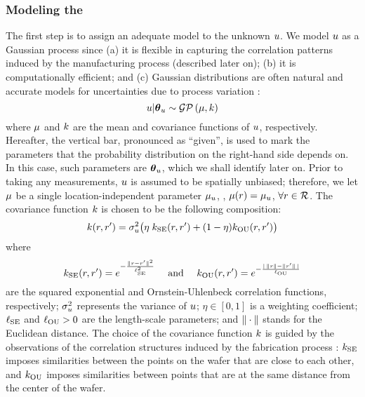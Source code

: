 \subsubsection{Modeling the \qoi}
The first step is to assign an adequate model to the unknown $u$. We model $u$ as a Gaussian process \cite{rasmussen2006} since (a) it is flexible in capturing the correlation patterns induced by the manufacturing process (described later on); (b) it is computationally efficient; and (c) Gaussian distributions are often natural and accurate models for uncertainties due to process variation \cite{srivastava2010, juan2011, juan2012}:
\begin{equation} \elabel{u-prior}
  \u | \vparam_\u \sim \gaussianp{\fMean}{\fCov}
\end{equation}
where $\fMean$ and $\fCov$ are the mean and covariance functions of $u$, respectively. Hereafter, the vertical bar, pronounced as ``given'', is used to mark the parameters that the probability distribution on the right-hand side depends on. In this case, such parameters are ${\boldsymbol\theta}_u$, which we shall identify later on. Prior to taking any measurements, $u$ is assumed to be spatially unbiased; therefore, we let $\fMean$ be a single location-independent parameter $\mu_u$, \ie, $\fMean{r} = \mu_\u$, $\forall r \in \mathcal{R}$.
The covariance function $\fCov$ is chosen to be the following composition:
\begin{equation} \elabel{covariance-function}
  \fCov{\r, \r'} = \sigma_\u^2 \big( \eta \; \fCov_\SE(\r, \r') + (1 - \eta) \fCov_\OU(\r, \r') \big)
\end{equation}
where
\[
  \fCov_\SE(\r, \r') = e^{-\frac{\norm{\r - \r'}^2}{\ell_\SE^2}} \hspace{1em} \text{ and } \hspace{1em}
  \fCov_\OU(\r, \r') = e^{- \frac{\abs{\,\norm{\r} - \norm{\r'}\,}}{\ell_\OU}}
\]
are the squared exponential and Ornstein-Uhlenbeck correlation functions, respectively; $\sigma_u^2$ represents the variance of $u$; $\eta \in [0, 1]$ is a weighting coefficient; $\ell_{\text{SE}}$ and $\ell_{\text{OU}} > 0$ are the length-scale parameters; and $\| \cdot \|$ stands for the Euclidean distance.
The choice of the covariance function $\fCov$ is guided by the observations of the correlation structures induced by the fabrication process \cite{chandrakasan2001, cheng2011}: $\fCov_\SE$ imposes similarities between the points on the wafer that are close to each other, and $\fCov_\OU$ imposes similarities between points that are at the same distance from the center of the wafer.
